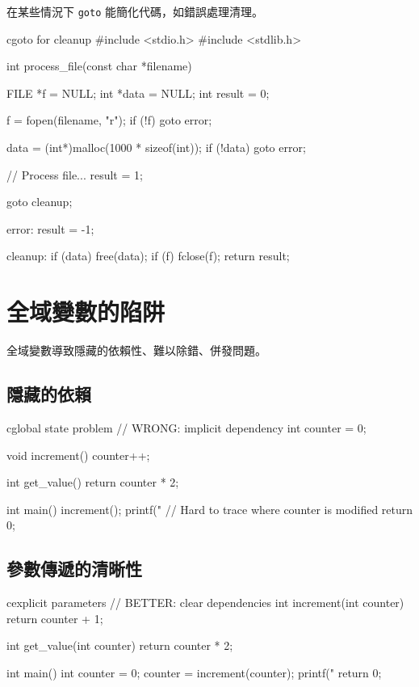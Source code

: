 在某些情況下 \texttt{goto} 能簡化代碼，如錯誤處理清理。

\begin{code}{c}{goto for cleanup}
#include <stdio.h>
#include <stdlib.h>

int process_file(const char *filename) {
    FILE *f = NULL;
    int *data = NULL;
    int result = 0;

    f = fopen(filename, "r");
    if (!f) goto error;

    data = (int*)malloc(1000 * sizeof(int));
    if (!data) goto error;

    // Process file...
    result = 1;

    goto cleanup;

error:
    result = -1;

cleanup:
    if (data) free(data);
    if (f) fclose(f);
    return result;
}
\end{code}


\section{全域變數的陷阱}

全域變數導致隱藏的依賴性、難以除錯、併發問題。

\subsection*{隱藏的依賴}

\begin{code}{c}{global state problem}
// WRONG: implicit dependency
int counter = 0;

void increment() {
    counter++;
}

int get_value() {
    return counter * 2;
}

int main() {
    increment();
    printf("%
    // Hard to trace where counter is modified
    return 0;
}
\end{code}

\subsection*{參數傳遞的清晰性}

\begin{code}{c}{explicit parameters}
// BETTER: clear dependencies
int increment(int counter) {
    return counter + 1;
}

int get_value(int counter) {
    return counter * 2;
}

int main() {
    int counter = 0;
    counter = increment(counter);
    printf("%
    return 0;
}
\end{code}


